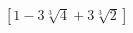 \begin{esercizio}[\Ast]
\begin{multicols}{2}
\begin{enumeratea}
  \hfill \(\left[1-3\sqrt[3]4+3\sqrt[3]2\right]\)
 \end{enumeratea}
 \end{multicols}
\end{esercizio}


